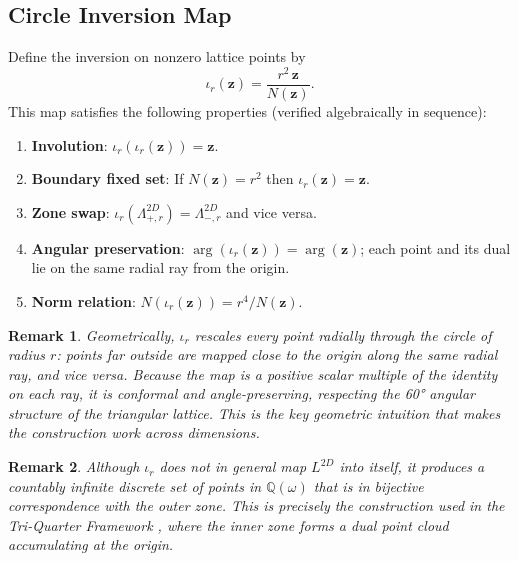 \documentclass{article}
\newtheorem{remark}{Remark}
\begin{document}
\subsection{Circle Inversion Map}
Define the inversion on nonzero lattice points by
\[
\iota_r(\mathbf{z}) = \frac{r^2 \, \mathbf{z}}{N(\mathbf{z})}.
\]
This map satisfies the following properties (verified algebraically in sequence):
\begin{enumerate}
  \item \textbf{Involution}: \(\iota_r(\iota_r(\mathbf{z})) = \mathbf{z}\).
  \item \textbf{Boundary fixed set}: If \(N(\mathbf{z}) = r^2\) then \(\iota_r(\mathbf{z}) = \mathbf{z}\).
  \item \textbf{Zone swap}: \(\iota_r(\Lambda_{+,r}^{2D}) = \Lambda_{-,r}^{2D}\) and vice versa.
  \item \textbf{Angular preservation}: \(\arg(\iota_r(\mathbf{z})) = \arg(\mathbf{z})\); each point and its dual lie on the same radial ray from the origin.
  \item \textbf{Norm relation}: \(N(\iota_r(\mathbf{z})) = r^4 / N(\mathbf{z})\).
\end{enumerate}
\begin{remark}
Geometrically, \(\iota_r\) rescales every point radially through the circle of radius \(r\): points far outside are mapped close to the origin along the same radial ray, and vice versa. Because the map is a positive scalar multiple of the identity on each ray, it is conformal and angle-preserving, respecting the 60° angular structure of the triangular lattice. This is the key geometric intuition that makes the construction work across dimensions.
\end{remark}
\begin{remark}
Although \(\iota_r\) does not in general map \(L^{2D}\) into itself, it produces a countably infinite discrete set of points in \(\mathbb{Q}(\omega)\) that is in bijective correspondence with the outer zone. This is precisely the construction used in the Tri-Quarter Framework \cite{Schmidt2025}, where the inner zone forms a dual point cloud accumulating at the origin.
\end{remark}
\end{document}
